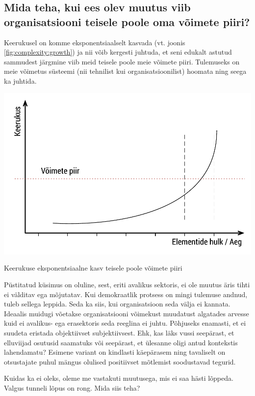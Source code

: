 \subsection{Mida teha, kui ees olev muutus viib organisatsiooni teisele poole oma võimete piiri?}
Keerukusel on komme eksponentsiaalselt kasvada (vt. joonis \ref{fig:complexity:growth}) ja nii võib kergesti juhtuda, et seni edukalt astutud sammudest järgmine viib meid teisele poole meie võimete piiri. Tulemuseks on meie võimetus süsteemi (nii tehnilist kui organisatsioonilist) hoomata ning seega ka juhtida. 

\begin{marginfigure}
		\includegraphics[width=\linewidth]{keerukus.pdf}
		\caption{Keerukuse eksponentsiaalne kasv teisele poole võimete piiri}
		\label{fig:complexity:growth}
\end{marginfigure}


Püstitatud küsimus on oluline, sest, eriti avalikus sektoris, ei ole muutus äris tihti ei välditav ega mõjutatav. Kui demokraatlik protsess on mingi tulemuse andnud, tuleb sellega leppida. Seda ka siis, kui organisatsioon seda välja ei kannata. Ideaalis muidugi võetakse organisatsiooni võimekust muudatust algatades arvesse kuid ei avalikus- ega erasektoris seda reeglina ei juhtu. Põhjuseks enamasti, et ei suudeta eristada objektiivset subjektiivsest. Ehk, kas läks vussi seepärast, et elluviijad osutusid saamatuks või seepärast, et ülesanne oligi antud kontekstis lahendamatu? Esimene variant on kindlasti käepärasem ning tavaliselt on otsustajate puhul mängus olulised positiivset mõtlemist soodustavad tegurid. 

Kuidas ka ei oleks, oleme me vastakuti muutusega, mis ei saa hästi lõppeda. Valgus tunneli lõpus on rong. Mida siis teha? 

